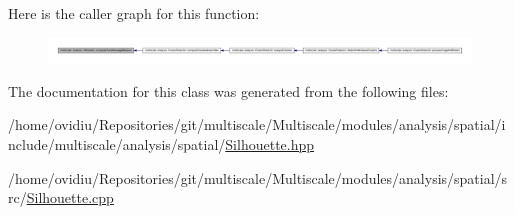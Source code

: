 \-Here is the caller graph for this function\-:\nopagebreak
\begin{figure}[H]
\begin{center}
\leavevmode
\includegraphics[width=350pt]{classmultiscale_1_1analysis_1_1Silhouette_a21fab3292947caed2dbab0da542ac24c_icgraph}
\end{center}
\end{figure}




\-The documentation for this class was generated from the following files\-:\begin{DoxyCompactItemize}
\item 
/home/ovidiu/\-Repositories/git/multiscale/\-Multiscale/modules/analysis/spatial/include/multiscale/analysis/spatial/\hyperlink{Silhouette_8hpp}{\-Silhouette.\-hpp}\item 
/home/ovidiu/\-Repositories/git/multiscale/\-Multiscale/modules/analysis/spatial/src/\hyperlink{Silhouette_8cpp}{\-Silhouette.\-cpp}\end{DoxyCompactItemize}
